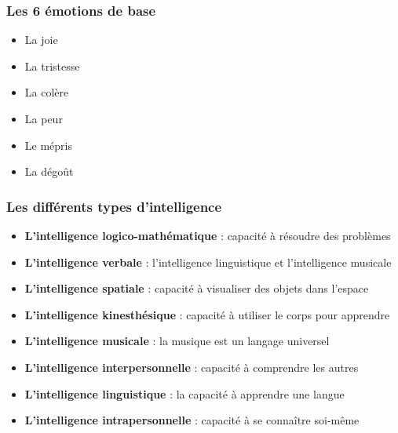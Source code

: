 \documentclass[12pt, a4paper]{article}
\begin{document}
\subsubsection{Les 6 émotions de base}
\begin{itemize}
	\item La joie
	\item La tristesse
	\item La colère
	\item La peur
	\item Le mépris
	\item La dégoût
\end{itemize}

\subsubsection{Les différents types d'intelligence}
\begin{itemize}
	\item \textbf{L'intelligence logico-mathématique} : capacité à résoudre des problèmes
	\item \textbf{L'intelligence verbale} : l'intelligence linguistique et l'intelligence musicale
	\item \textbf{L'intelligence spatiale} : capacité à visualiser des objets dans l'espace
	\item \textbf{L'intelligence kinesthésique} : capacité à utiliser le corps pour apprendre
	\item \textbf{L'intelligence musicale} : la musique est un langage universel
	\item \textbf{L'intelligence interpersonnelle} : capacité à comprendre les autres
	\item \textbf{L'intelligence linguistique} : la capacité à apprendre une langue
	\item \textbf{L'intelligence intrapersonnelle} : capacité à se connaître soi-même
\end{itemize}
\end{document}
